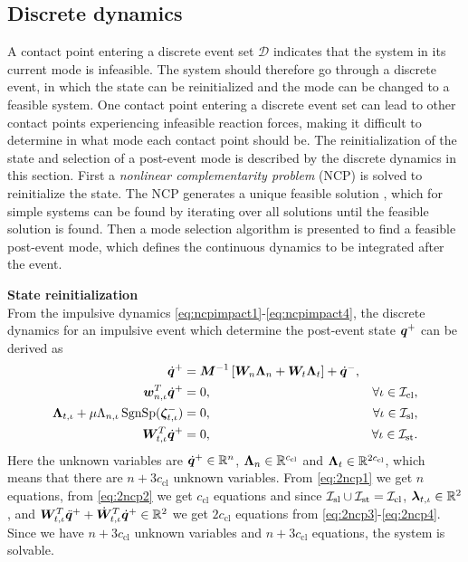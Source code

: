 \documentclass[../DC2017114Bouma.tex]{subfiles}
\begin{document}
\subsection{Discrete dynamics}\label{sec:2discdyn}
A contact point entering a discrete event set $\mathcal{D}$ indicates that the system in its current mode is infeasible. The system should therefore go through a discrete event, in which the state can be reinitialized and the mode can be changed to a feasible system. One contact point entering a discrete event set can lead to other contact points experiencing infeasible reaction forces, making it difficult to determine in what mode each contact point should be. The reinitialization of the state and selection of a post-event mode is described by the discrete dynamics in this section. First a \textit{nonlinear complementarity problem} (NCP) is solved to reinitialize the state. The NCP generates a unique feasible solution \cite{Delassus1917}, which for simple systems can be found by iterating over all solutions until the feasible solution is found. Then a mode selection algorithm is presented to find a feasible post-event mode, which defines the continuous dynamics to be integrated after the event.
%

\textbf{State reinitialization}\\
From the impulsive dynamics \eqref{eq:ncpimpact1}-\eqref{eq:ncpimpact4}, the discrete dynamics for an impulsive event which determine the post-event state ${\boldsymbol{q}}^+$ can be derived as
\begin{align}
\dot{{\boldsymbol{q}}}^+ &= {\boldsymbol{M}}^{-1}\left[{\boldsymbol{W}}_{n}\boldsymbol{\Lambda}_{n} + {\boldsymbol{W}}_{t}\boldsymbol{\Lambda}_{t}\right] + \dot{{\boldsymbol{q}}}^-, \label{eq:2ncp1}\\
{\boldsymbol{w}}^T_{n,\iota}\dot{{\boldsymbol{q}}}^+ &= 0, &\forall \iota\in\mathcal{I}_{\text{cl}},\label{eq:2ncp2}\\
\boldsymbol{\Lambda}_{t,\iota} + \mu\Lambda_{n,\iota}\operatorname{\text{SgnSp}}(\boldsymbol{\zeta}^-_{t,\iota})&= 0, &\forall \iota\in\mathcal{I}_{\text{sl}},\label{eq:2ncp3}\\
{\boldsymbol{W}}^T_{t,\iota}\dot{{\boldsymbol{q}}}^+ &= 0, &\forall \iota\in\mathcal{I}_{\text{st}}.\label{eq:2ncp4}
\end{align}
Here the unknown variables are $\dot{{\boldsymbol{q}}}^+\in\mathbb{R}^{n}$, $\boldsymbol{\Lambda}_{n}\in\mathbb{R}^{c_{\text{cl}}}$ and $\boldsymbol{\Lambda}_{t}\in\mathbb{R}^{2c_{\text{cl}}}$, which means that there are $n+3c_{\text{cl}}$ unknown variables. From \eqref{eq:2ncp1} we get $n$ equations, from \eqref{eq:2ncp2} we get $c_{\text{cl}}$ equations and since $\mathcal{I}_{\text{sl}}\cup\mathcal{I}_{\text{st}}=\mathcal{I}_{\text{cl}}$, $\boldsymbol{\lambda}_{t,\iota}\in\mathbb{R}^2$, and ${\boldsymbol{W}}^T_{t,\iota}\ddot{{\boldsymbol{q}}}^+ + \dot{{\boldsymbol{W}}}^T_{t,\iota}\dot{{\boldsymbol{q}}}^+ \in\mathbb{R}^2$ we get $2c_{\text{cl}}$ equations from \eqref{eq:2ncp3}-\eqref{eq:2ncp4}. Since we have $n+3c_{\text{cl}}$ unknown variables and $n+3c_{\text{cl}}$ equations, the system is solvable.
\end{document}
